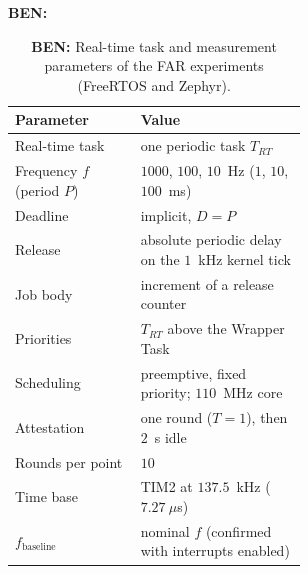 \documentclass{ieeeaccess}
\DeclareRobustCommand{\ben}[1]{{\color{BENcolor}\textbf{BEN:} #1}}
\begin{document}
\begin{table}[!ht]
  \centering
  \small
  \setlength{\tabcolsep}{4pt}
  \ben{%
  \begin{tabular}{@{}lp{0.58\linewidth}@{}}
    \toprule
    \textbf{Parameter} & \textbf{Value} \\
    \midrule
    Real-time task & one periodic task $T_{RT}$ \\
    Frequency $f$ (period $P$) & $1000$, $100$, $10$~Hz ($1$, $10$, $100$~ms) \\
    Deadline & implicit, $D = P$ \\
    Release & absolute periodic delay on the $1$~kHz kernel tick \\
    Job body & increment of a release counter \\
    Priorities & $T_{RT}$ above the Wrapper Task \\
    Scheduling & preemptive, fixed priority; $110$~MHz core \\
    Attestation & one round ($T = 1$), then $2$~s idle \\
    Rounds per point & $10$ \\
    Time base & TIM2 at $137.5$~kHz ($7.27~\mu$s) \\
    $f_{\text{baseline}}$ & nominal $f$ (confirmed with interrupts enabled) \\
    \bottomrule
  \end{tabular}}
  \caption{\ben{Real-time task and measurement parameters of the FAR experiments (FreeRTOS and Zephyr).}}
  \label{tab:rt-task}
\end{table}


\end{document}

